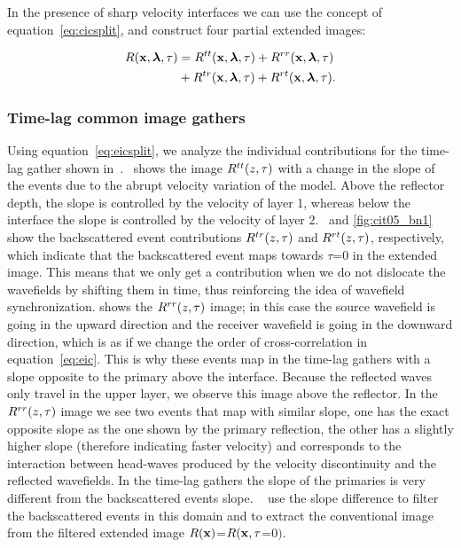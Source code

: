 In the presence of sharp velocity interfaces we can use the concept of equation~\ref{eq:cicsplit}, and construct four partial 
extended images:

\begin{align}
\nonumber R({\bf x},{\boldsymbol{\lambda}},\tau) &= R^{tt}({\bf x},{\boldsymbol{\lambda}},\tau)+R^{rr}({\bf x},{\boldsymbol{\lambda}},\tau) \\
     &+R^{tr}({\bf x},{\boldsymbol{\lambda}},\tau)+R^{rt}({\bf x},{\boldsymbol{\lambda}},\tau).
\label{eq:eicsplit}
\end{align}





\subsubsection{Time-lag common image gathers}

Using equation~\ref{eq:eicsplit}, we  analyze the individual contributions
for the time-lag gather shown in~.~ shows the image $R^{tt}(z,\tau)$ with
 a change in the slope of the events due to the abrupt velocity variation of the model. 
%
Above the reflector depth, the slope is controlled by the velocity of layer 1, whereas below the interface the slope is controlled
 by the velocity of layer 2.~ and \ref{fig:cit05_bn1} show the backscattered
 event contributions $R^{tr}(z,\tau)$ and $R^{rt}(z,\tau)$, respectively, which indicate that the backscattered event maps towards $\tau$=$0$
in the extended image. This means that we only get a contribution when we do not dislocate the wavefields by shifting them in time, 
thus reinforcing the idea of wavefield synchronization. 
%
%
 shows the $R^{rr}(z,\tau)$ image; in this case the source wavefield is going in the upward
direction and the receiver wavefield is going in the downward direction, which is as if we change the order of cross-correlation in
equation~\ref{eq:eic}. This is why these events map in the time-lag gathers with a slope opposite to the primary above the
interface. Because the reflected waves only travel in the upper layer, we observe this image above the reflector. In the $R^{rr}(z,\tau)$
image we see two events that map with similar slope, one has the exact opposite slope as the one shown by the primary reflection,
the other has a slightly higher slope (therefore indicating faster velocity) and corresponds to the interaction between head-waves produced by 
the velocity discontinuity and the reflected wavefields. In the time-lag gathers the slope of the primaries is very different
from the backscattered events slope. ~\cite{kaelin:3125} use the slope difference to filter the backscattered 
events in this domain and to extract the conventional image from the filtered extended image $R({\bf x})$=$R({\bf x},\tau$=$0)$. 

